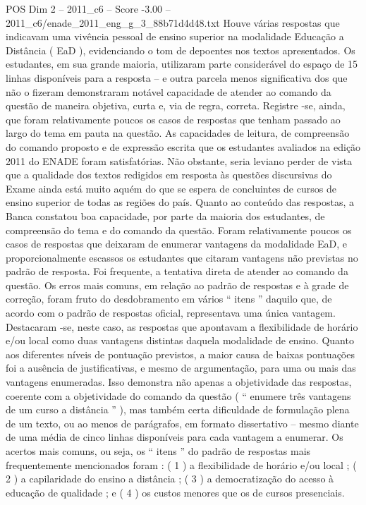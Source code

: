 \begin{textsample}{POS Dim 2 – 2011\_c6 – Score -3.00 – 2011\_c6/enade\_2011\_eng\_g\_3\_88b71d4d48.txt}
Houve várias respostas que indicavam uma vivência pessoal de ensino superior na modalidade Educação a Distância ( EaD ), evidenciando o tom de depoentes nos textos apresentados.
Os estudantes, em sua grande maioria, utilizaram parte considerável do espaço de 15 linhas disponíveis para a resposta – e outra parcela menos significativa dos que não o fizeram demonstraram notável capacidade de atender ao comando da questão de maneira objetiva, curta e, via de regra, correta.
Registre -se, ainda, que foram relativamente poucos os casos de respostas que tenham passado ao largo do tema em pauta na questão.
As capacidades de leitura, de compreensão do comando proposto e de expressão escrita que os estudantes avaliados na edição 2011 do ENADE foram satisfatórias.
Não obstante, seria leviano perder de vista que a qualidade dos textos redigidos em resposta às questões discursivas do Exame ainda está muito aquém do que se espera de concluintes de cursos de ensino superior de todas as regiões do país.
Quanto ao conteúdo das respostas, a Banca constatou boa capacidade, por parte da maioria dos estudantes, de compreensão do tema e do comando da questão.
Foram relativamente poucos os casos de respostas que deixaram de enumerar vantagens da modalidade EaD, e proporcionalmente escassos os estudantes que citaram vantagens não previstas no padrão de resposta.
Foi frequente, a tentativa direta de atender ao comando da questão.
Os erros mais comuns, em relação ao padrão de respostas e à grade de correção, foram fruto do desdobramento em vários “ itens ” daquilo que, de acordo com o padrão de respostas oficial, representava uma única vantagem.
Destacaram -se, neste caso, as respostas que apontavam a flexibilidade de horário e/ou local como duas vantagens distintas daquela modalidade de ensino.
Quanto aos diferentes níveis de pontuação previstos, a maior causa de baixas pontuações foi a ausência de justificativas, e mesmo de argumentação, para uma ou mais das vantagens enumeradas.
Isso demonstra não apenas a objetividade das respostas, coerente com a objetividade do comando da questão ( “ enumere três vantagens de um curso a distância ” ), mas também certa dificuldade de formulação plena de um texto, ou ao menos de parágrafos, em formato dissertativo – mesmo diante de uma média de cinco linhas disponíveis para cada vantagem a enumerar.
Os acertos mais comuns, ou seja, os “ itens ” do padrão de respostas mais frequentemente mencionados foram : ( 1 ) a flexibilidade de horário e/ou local ; ( 2 ) a capilaridade do ensino a distância ; ( 3 ) a democratização do acesso à educação de qualidade ; e ( 4 ) os custos menores que os de cursos presenciais.

\end{textsample}
